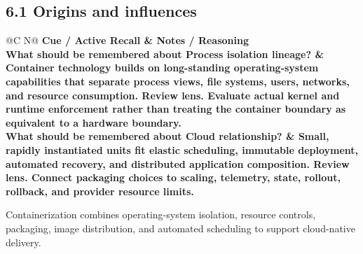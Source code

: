 \documentclass[11pt]{article}
\newcommand{\CornellHeader}{\rowcolor{Navy}\color{white}\bfseries Cue / Active Recall & \color{white}\bfseries Notes / Reasoning \\\endhead}
\newcommand{\CornellRow}[2]{\cellcolor{CueGray}\textbf{#1} & #2 \\\addlinespace[3pt]}
\begin{document}
\subsection{6.1 Origins and influences}
\begin{longtable}{@{}C N@{}}
\CornellHeader
\CornellRow{What should be remembered about Process isolation lineage?}{Container technology builds on long-standing operating-system capabilities that separate process views, file systems, users, networks, and resource consumption. \textbf{Review lens.} Evaluate actual kernel and runtime enforcement rather than treating the container boundary as equivalent to a hardware boundary.}
\CornellRow{What should be remembered about Cloud relationship?}{Small, rapidly instantiated units fit elastic scheduling, immutable deployment, automated recovery, and distributed application composition. \textbf{Review lens.} Connect packaging choices to scaling, telemetry, state, rollout, rollback, and provider resource limits.}
\end{longtable}
\begin{sectionsummarybox}
Containerization combines operating-system isolation, resource controls, packaging, image distribution, and automated scheduling to support cloud-native delivery.
\end{sectionsummarybox}
\end{document}
